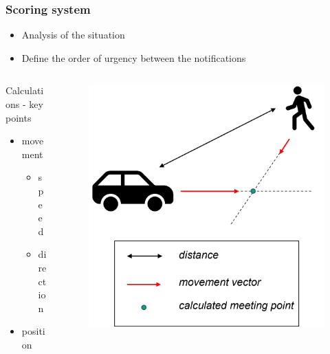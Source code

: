\documentclass{beamer}
\begin{document}
\begin{frame}
    \frametitle{Scoring system}

    \begin{itemize}
        \item Analysis of the situation
        \item Define the order of urgency between the notifications
    \end{itemize}
    \begin{columns}
        \begin{column}{0.5\textwidth}
            \begin{block}{Calculations - key points}
                \begin{itemize}
                    \item movement
                    \begin{itemize}
                        \item speed
                        \item direction
                    \end{itemize}
                    \item position
                \end{itemize}
            \end{block}
        \end{column}
        \begin{column}{0.4\textwidth}
            \begin{figure}
                \centering
                \includegraphics[width=1\textwidth]{pics/Core factors of the calculation}
            \end{figure}
        \end{column}
    \end{columns}
\end{frame}
\end{document}
